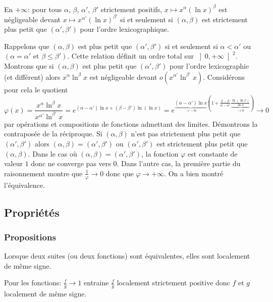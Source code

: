 \begin{prop}
  En $+\infty$: pour tous $\alpha$, $\beta$, $\alpha'$, $\beta'$ strictement positifs, $x\mapsto x^{\alpha}(\ln x)^{\beta}$ est négligeable devant $x\mapsto x^{\alpha'}(\ln x)^{\beta'}$ si et seulement si $(\alpha,\beta)$ est strictement plus petit que $(\alpha',\beta')$ pour l'ordre lexicographique. 
\end{prop}
\begin{demo} 
  Rappelons que $(\alpha,\beta)$ est plus petit que $(\alpha',\beta')$ si et seulement si $\alpha < \alpha'$  ou $\left( \alpha = \alpha' \text{ et } \beta \leq \beta'\right)$.\newline
Cette relation définit un ordre total sur $\left] 0, + \infty\right[^2$.\newline
Montrons que si $(\alpha,\beta)$ est plus petit que $(\alpha', \beta')$ pour l'ordre lexicographie (et différent) alors $x^\alpha \ln^\beta x$ est négligeable devant  $o\left( x^{\alpha'} \ln^{\beta'} x\right)$. Considérons pour cela le quotient
\[
\varphi(x) = 
\frac{x^\alpha \ln^\beta x}{x^{\alpha'} \ln^{\beta'} x}
 = e^{(\alpha - \alpha')\ln x + (\beta - \beta')\ln (\ln x)}
 = e^{\underset{\rightarrow - \infty}{\underbrace{(\alpha - \alpha')\ln x}}\left( 1 + \frac{\beta - \beta'}{\alpha - \alpha'}
 \underset{\rightarrow 0}{\underbrace{\frac{\ln (\ln x)}{\ln x}}} \right)} \rightarrow 0
\]
par opérations et compositions de fonctions admettant des limites.\newline
Démontrons la contraposée de la réciproque.\newline
Si $(\alpha,\beta)$ n'est pas strictement plus petit que $(\alpha',\beta')$ alors $(\alpha,\beta)=(\alpha',\beta')$ ou  $(\alpha',\beta')$ est strictement plus petit que $(\alpha,\beta)$.\newline
Dans le cas où $(\alpha,\beta)=(\alpha',\beta')$, la fonction $\varphi$ est constante de valeur $1$ donc ne converge pas vers $0$.\newline
Dans l'autre cas, la première partie du raisonnement montre que $\frac{1}{\varphi} \rightarrow 0$ donc que $\varphi \rightarrow + \infty$.\newline
On a bien montré l'équivalence.
\end{demo}


\subsection{Propriétés}
\subsubsection{Propositions}
\begin{prop}
 Lorsque deux suites (ou deux fonctions) sont équivalentes, elles sont localement de même signe.
\end{prop}
\begin{demo}
 Pour les fonctions: $\frac{f}{g}\rightarrow 1$ entraine $\frac{f}{g}$ localement strictement positive donc $f$ et $g$ localement de même signe.
\end{demo}

